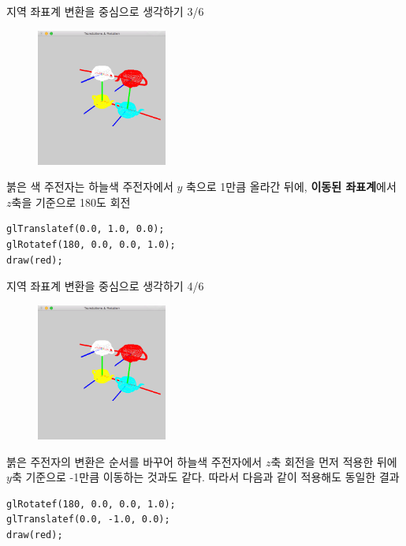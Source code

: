 \documentclass{beamer}
\begin{document}
\begin{frame}[fragile]{지역 좌표계 변환을 중심으로 생각하기 3/6}

\begin{figure}
    \includegraphics[height=4.5cm]{OGL_transform/localCoordXform.png}
\end{figure}

붉은 색 주전자는 하늘색 주전자에서 $y$ 축으로 1만큼 올라간 뒤에, {\bf 이동된 좌표계}에서 $z$축을 기준으로 180도 회전

\begin{verbatim}
glTranslatef(0.0, 1.0, 0.0);
glRotatef(180, 0.0, 0.0, 1.0);
draw(red);
\end{verbatim}

\end{frame}

\begin{frame}[fragile]{지역 좌표계 변환을 중심으로 생각하기 4/6}

\begin{figure}
    \includegraphics[height=4.5cm]{OGL_transform/localCoordXform.png}
\end{figure}

붉은 주전자의 변환은 순서를 바꾸어 하늘색 주전자에서 $z$축 회전을 먼저 적용한 뒤에 
$y$축 기준으로 -1만큼 이동하는 것과도 같다. 따라서 다음과 같이 적용해도 동일한 결과

\begin{verbatim}
glRotatef(180, 0.0, 0.0, 1.0);
glTranslatef(0.0, -1.0, 0.0);
draw(red);
\end{verbatim}

\end{frame}
\end{document}
